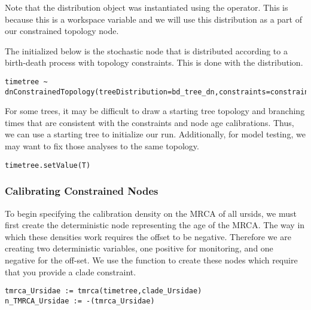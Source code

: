 Note that the distribution object  was instantiated using the \cl{=} operator. This is because this is a workspace variable and we will use this distribution as a part of our constrained topology node.

The  initialized below is the stochastic node that is distributed according to a birth-death process with topology constraints. This is done with the  distribution.

{\tt \begin{snugshade*}
\begin{lstlisting}
timetree ~ dnConstrainedTopology(treeDistribution=bd_tree_dn,constraints=constraints)
\end{lstlisting}
\end{snugshade*}}


For some trees, it may be difficult to draw a starting tree topology and branching times that are consistent with the constraints and node age calibrations. 
Thus, we can use a starting tree to initialize our run.
Additionally, for model testing, we may want to fix those analyses to the same topology.

{\tt \begin{snugshade*}
\begin{lstlisting}
timetree.setValue(T)
\end{lstlisting}
\end{snugshade*}}


\subsubsection{Calibrating Constrained Nodes}




To begin specifying the calibration density on the MRCA of all ursids, we must first create the deterministic node representing the age of the MRCA.
The way in which these densities work requires the offset to be negative. 
Therefore we are creating two deterministic variables, one positive for monitoring, and one negative for the off-set.
We use the  function to create these nodes which require that you provide a clade constraint.
{\tt \begin{snugshade*}
\begin{lstlisting}
tmrca_Ursidae := tmrca(timetree,clade_Ursidae)
n_TMRCA_Ursidae := -(tmrca_Ursidae)
\end{lstlisting}
\end{snugshade*}}

